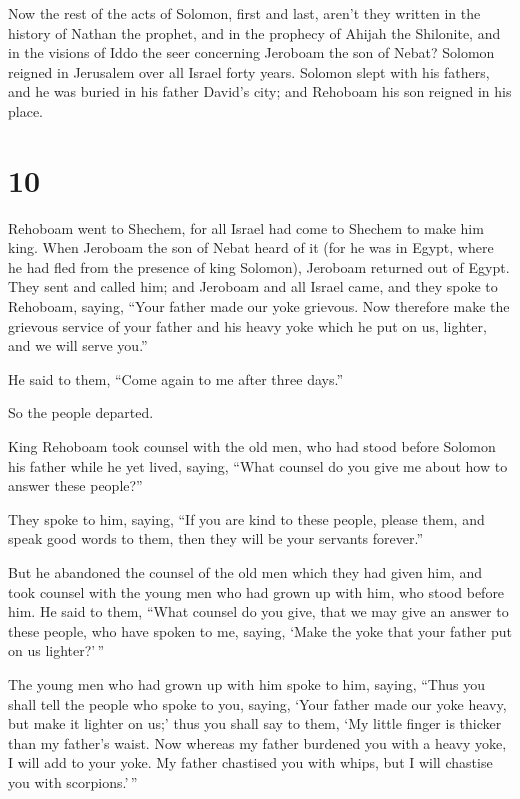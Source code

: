  Now the rest of the acts of Solomon, first and last,
aren't they written in the history of Nathan the prophet, and in the
prophecy of Ahijah the Shilonite, and in the visions of Iddo the seer
concerning Jeroboam the son of Nebat?  Solomon reigned in
Jerusalem over all Israel forty years.  Solomon slept with
his fathers, and he was buried in his father David's city; and Rehoboam
his son reigned in his place.

\hypertarget{section-9}{%
\section{10}\label{section-9}}

 Rehoboam went to Shechem, for all Israel had come to
Shechem to make him king.  When Jeroboam the son of Nebat
heard of it (for he was in Egypt, where he had fled from the presence of
king Solomon), Jeroboam returned out of Egypt.  They sent
and called him; and Jeroboam and all Israel came, and they spoke to
Rehoboam, saying,  ``Your father made our yoke grievous. Now
therefore make the grievous service of your father and his heavy yoke
which he put on us, lighter, and we will serve you.''

 He said to them, ``Come again to me after three days.''

So the people departed.

 King Rehoboam took counsel with the old men, who had stood
before Solomon his father while he yet lived, saying, ``What counsel do
you give me about how to answer these people?''

 They spoke to him, saying, ``If you are kind to these
people, please them, and speak good words to them, then they will be
your servants forever.''

 But he abandoned the counsel of the old men which they had
given him, and took counsel with the young men who had grown up with
him, who stood before him.  He said to them, ``What counsel
do you give, that we may give an answer to these people, who have spoken
to me, saying, `Make the yoke that your father put on us lighter?'\,''

 The young men who had grown up with him spoke to him,
saying, ``Thus you shall tell the people who spoke to you, saying, `Your
father made our yoke heavy, but make it lighter on us;' thus you shall
say to them, `My little finger is thicker than my father's waist.
 Now whereas my father burdened you with a heavy yoke, I
will add to your yoke. My father chastised you with whips, but I will
chastise you with scorpions.'\,''

